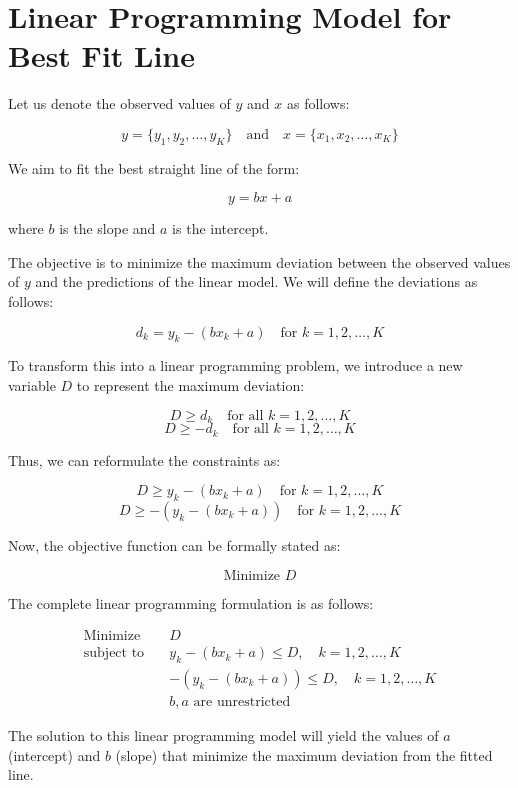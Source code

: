 \documentclass{article}
\begin{document}
\section*{Linear Programming Model for Best Fit Line}

Let us denote the observed values of \( y \) and \( x \) as follows:

\[
y = \{ y_{1}, y_{2}, \ldots, y_{K} \} \quad \text{and} \quad x = \{ x_{1}, x_{2}, \ldots, x_{K} \}
\]

We aim to fit the best straight line of the form:

\[
y = bx + a
\]

where \( b \) is the slope and \( a \) is the intercept.

The objective is to minimize the maximum deviation between the observed values of \( y \) and the predictions of the linear model. We will define the deviations as follows:

\[
d_{k} = y_{k} - (bx_{k} + a) \quad \text{for } k = 1, 2, \ldots, K
\]

To transform this into a linear programming problem, we introduce a new variable \( D \) to represent the maximum deviation:

\[
D \geq d_{k} \quad \text{for all } k = 1, 2, \ldots, K
\]
\[
D \geq -d_{k} \quad \text{for all } k = 1, 2, \ldots, K
\]

Thus, we can reformulate the constraints as:

\[
D \geq y_{k} - (bx_{k} + a) \quad \text{for } k = 1, 2, \ldots, K
\]
\[
D \geq -(y_{k} - (bx_{k} + a)) \quad \text{for } k = 1, 2, \ldots, K
\]

Now, the objective function can be formally stated as:

\[
\text{Minimize } D
\]

The complete linear programming formulation is as follows:

\[
\begin{align*}
\text{Minimize} \quad & D \\
\text{subject to} \quad & y_{k} - (bx_{k} + a) \leq D, \quad k = 1, 2, \ldots, K \\
& -(y_{k} - (bx_{k} + a)) \leq D, \quad k = 1, 2, \ldots, K \\
& b, a \text{ are unrestricted}
\end{align*}
\]

The solution to this linear programming model will yield the values of \( a \) (intercept) and \( b \) (slope) that minimize the maximum deviation from the fitted line.
\end{document}
